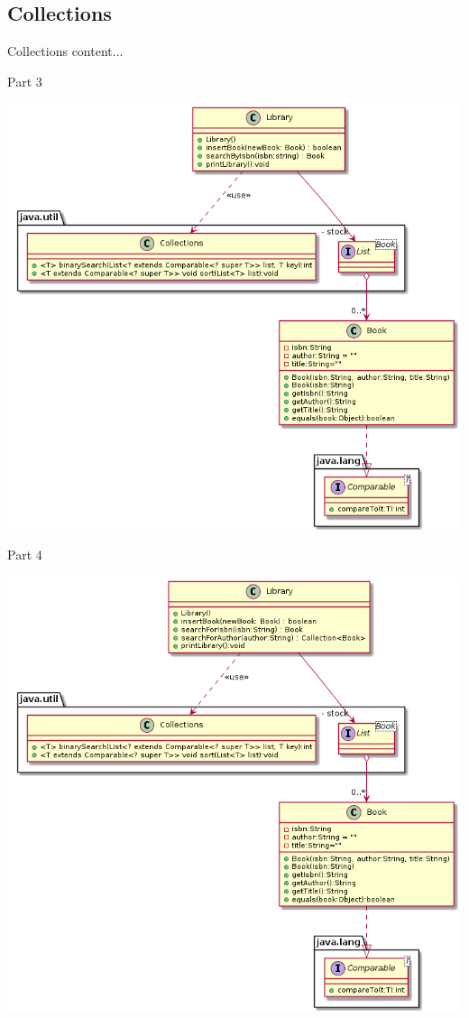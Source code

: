 \subsection{Collections}
\begin{frame}{Collections}
	content...
\end{frame}
\begin{frame}{Part 3}

	\begin{center}
		\includegraphics[scale=.34]{07_collection/hands_on_03.png}
	\end{center}

\end{frame}

\begin{frame}{Part 4}

	\begin{center}
		\includegraphics[scale=.34]{07_collection/hands_on_04.png}
	\end{center}
		

		
\end{frame}



